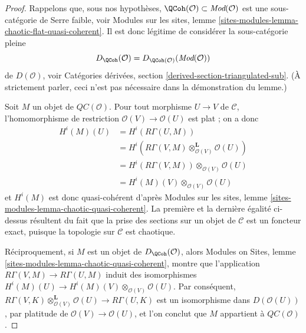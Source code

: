 \begin{proof}
Rappelons que, sous nos hypothèses,
$\QCoh(\mathcal{O}) \subset \textit{Mod}(\mathcal{O})$ est une sous-catégorie
de Serre faible, voir Modules sur les sites, lemme
\ref{sites-modules-lemma-chaotic-flat-quasi-coherent}. Il est donc légitime de
considérer la sous-catégorie pleine
$$
D_\QCoh(\mathcal{O}) = D_{\QCoh(\mathcal{O})}(\textit{Mod}(\mathcal{O}))
$$
de $D(\mathcal{O})$, voir Catégories dérivées, section
\ref{derived-section-triangulated-sub}. (À strictement parler, ceci n'est pas
nécessaire dans la démonstration du lemme.)

\medskip\noindent
Soit $M$ un objet de $\mathit{QC}(\mathcal{O})$. Pour tout morphisme
$U \to V$ de $\mathcal{C}$, l'homomorphisme de restriction
$\mathcal{O}(V) \to \mathcal{O}(U)$ est plat ; on a donc
\begin{align*}
H^i(M)(U)
& =
H^i(R\Gamma(U, M)) \\
& =
H^i(R\Gamma(V, M) \otimes_{\mathcal{O}(V)}^\mathbf{L} \mathcal{O}(U)) \\
& =
H^i(R\Gamma(V, M)) \otimes_{\mathcal{O}(V)} \mathcal{O}(U) \\
& =
H^i(M)(V) \otimes_{\mathcal{O}(V)} \mathcal{O}(U)
\end{align*}
et $H^i(M)$ est donc quasi-cohérent d'après Modules sur les sites, lemme
\ref{sites-modules-lemma-chaotic-quasi-coherent}. La première et la dernière
égalité ci-dessus résultent du fait que la prise des sections sur un objet de
$\mathcal{C}$ est un foncteur exact, puisque la topologie sur $\mathcal{C}$
est chaotique.

\medskip\noindent
Réciproquement, si $M$ est un objet de $D_\QCoh(\mathcal{O})$, alors Modules
on Sites, lemme \ref{sites-modules-lemma-chaotic-quasi-coherent}, montre que
l'application $R\Gamma(V, M) \to R\Gamma(U, M)$ induit des isomorphismes
$H^i(M)(U) \to H^i(M)(V) \otimes_{\mathcal{O}(V)} \mathcal{O}(U)$.
Par conséquent,
$R\Gamma(V, K) \otimes_{\mathcal{O}(V)}^\mathbf{L} \mathcal{O}(U)
\to R\Gamma(U, K)$ est un isomorphisme dans $D(\mathcal{O}(U))$, par platitude
de $\mathcal{O}(V) \to \mathcal{O}(U)$, et l'on conclut que $M$ appartient à
$\mathit{QC}(\mathcal{O})$.
\end{proof}


